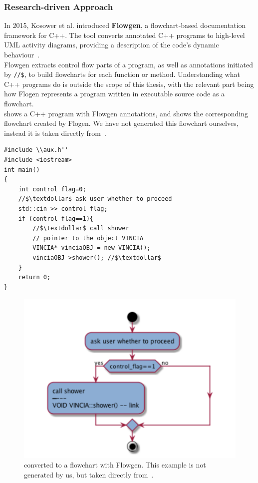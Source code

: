\subsubsection{Research-driven Approach}

In 2015, Kosower et al. introduced \textbf{Flowgen}, a flowchart-based documentation framework for C++. The tool converts annotated C++ programs to high-level UML activity diagrams, providing a description of the code's dynamic behaviour~\cite{flowgen}. \\

Flowgen extracts control flow parts of a program, as well as annotations initiated by \texttt{//\$}, to build flowcharts for each function or method. Understanding what C++ programs do is outside the scope of this thesis, with the relevant part being how Flogen represents a program written in executable source code as a flowchart. \\

 shows a C++ program with Flowgen annotations, and  shows the corresponding flowchart created by Flogen. We have not generated this flowchart ourselves, instead it is taken directly from~\cite{flowgen}. \\

\begin{lstlisting}[caption={A C++ program.}, captionpos=b, label={c++prog}]
#include \\aux.h''
#include <iostream>
int main()
{
    int control flag=0;
    //$\textdollar$ ask user whether to proceed
    std::cin >> control flag;
    if (control flag==1){
        //$\textdollar$ call shower
        // pointer to the object VINCIA
        VINCIA* vinciaOBJ = new VINCIA();
        vinciaOBJ->shower(); //$\textdollar$
    }
    return 0;
}
\end{lstlisting}

\begin{figure}[ht]
    \centering
    \includegraphics[scale=0.6]{assets/chapter3/Flowgen.png}
    \caption{ converted to a flowchart with Flowgen. This example is not generated by us, but taken directly from~\cite{flowgen}.}
    \label{flowgenExample}
\end{figure}

